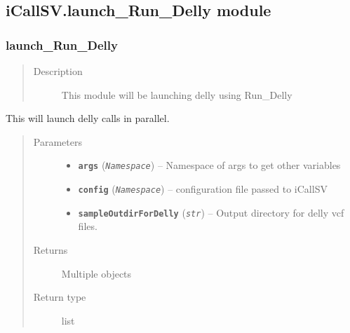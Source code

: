 \documentclass[letterpaper,10pt,english]{sphinxmanual}
\begin{document}
\subsection{iCallSV.launch\_Run\_Delly module}
\label{iCallSV:module-iCallSV.launch_Run_Delly}\label{iCallSV:icallsv-launch-run-delly-module}

\subsubsection{launch\_Run\_Delly}
\label{iCallSV:launch-run-delly}\begin{quote}\begin{description}
\item[{Description}] \leavevmode
This module will be launching delly using Run\_Delly

\end{description}\end{quote}

\begin{fulllineitems}
\label{iCallSV:iCallSV.launch_Run_Delly.launch_delly_for_different_analysis_type}
This will launch delly calls in parallel.
\begin{quote}\begin{description}
\item[{Parameters}] \leavevmode\begin{itemize}
\item {} 
\textbf{\texttt{args}} (\emph{\texttt{Namespace}}) -- Namespace of args to get other variables

\item {} 
\textbf{\texttt{config}} (\emph{\texttt{Namespace}}) -- configuration file passed to iCallSV

\item {} 
\textbf{\texttt{sampleOutdirForDelly}} (\emph{\texttt{str}}) -- Output directory for delly vcf files.

\end{itemize}

\item[{Returns}] \leavevmode
Multiple objects

\item[{Return type}] \leavevmode
list

\end{description}\end{quote}

\end{fulllineitems}
\end{document}
